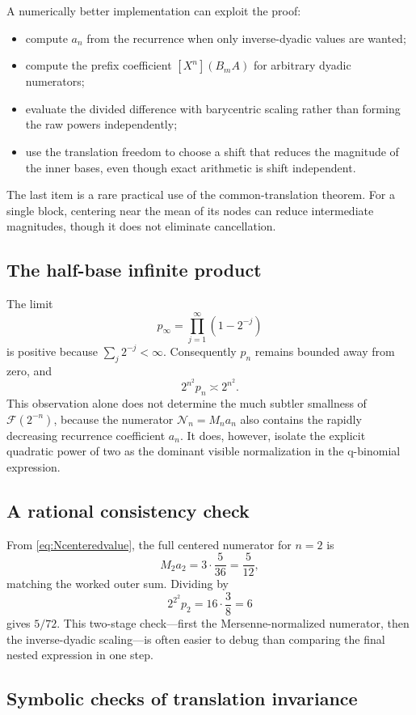 \documentclass[11pt,oneside]{article}
\theoremstyle{definition}
\theoremstyle{remark}
\newcommand{\F}{\mathcal F}
\newcommand{\coeff}[2]{\left[#1^{#2}\right]}
\begin{document}
A numerically better implementation can exploit the proof:
\begin{itemize}[leftmargin=2em]
\item compute $a_n$ from the recurrence when only inverse-dyadic values are
wanted;
\item compute the prefix coefficient
$\coeff{X}{n}(B_mA)$ for arbitrary dyadic numerators;
\item evaluate the divided difference with barycentric scaling rather than
forming the raw powers independently;
\item use the translation freedom to choose a shift that reduces the
magnitude of the inner bases, even though exact arithmetic is shift
independent.
\end{itemize}
The last item is a rare practical use of the common-translation theorem.
For a single block, centering near the mean of its nodes can reduce
intermediate magnitudes, though it does not eliminate cancellation.

\subsection{The half-base infinite product}

The limit
\[
 p_\infty=\prod_{j=1}^{\infty}(1-2^{-j})
\]
is positive because $\sum_j2^{-j}<\infty$.  Consequently
$p_n$ remains bounded away from zero, and
\[
 2^{n^2}p_n\asymp2^{n^2}.
\]
This observation alone does not determine the much subtler smallness of
$\F(2^{-n})$, because the numerator $\mathcal N_n=M_na_n$ also contains the
rapidly decreasing recurrence coefficient $a_n$.  It does, however, isolate
the explicit quadratic power of two as the dominant visible normalization
in the q-binomial expression.

\subsection{A rational consistency check}

From \eqref{eq:Ncenteredvalue}, the full centered numerator for $n=2$ is
\[
 M_2a_2=3\cdot\frac5{36}=\frac5{12},
\]
matching the worked outer sum.  Dividing by
\[
 2^{2^2}p_2=16\cdot\frac38=6
\]
gives $5/72$.  This two-stage check---first the Mersenne-normalized numerator,
then the inverse-dyadic scaling---is often easier to debug than comparing the
final nested expression in one step.

\subsection{Symbolic checks of translation invariance}
\end{document}
